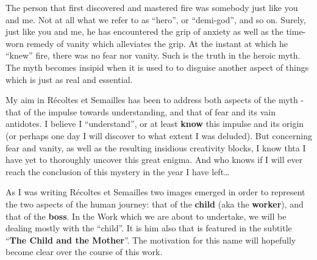 The person that first discovered and mastered fire was somebody just like you and me. 
Not at all what we refer to as ``hero'', or ``demi-god'', and so on.  
Surely, just like you and me, he has encountered the grip of anxiety as well as the 
time-worn remedy of vanity which alleviates the grip.
At the instant at which he ``knew'' fire, there was no fear nor vanity. 
Such is the truth in the heroic myth. 
The myth becomes insipid when it is used to
to disguise another aspect of things which is just as real and essential. 

My aim in R\'ecoltes et Semailles has been to address both aspects of the myth - that of
the impulse towards understanding, and that of fear and its vain antidotes. 
I believe I ``understand'', or at least \textbf{know} this impulse and its origin (or
perhaps one day I will discover to what extent I was deluded). 
But concerning fear and vanity, as well as the resulting insidious creativity blocks, 
I know thta I have yet to thoroughly uncover this great enigma. 
And who knows if I will ever reach the conclusion of this mystery in the year I have
left\ldots

As I was writing 
R\'ecoltes et Semailles 
two images emerged in order to represent the two aspects of the human journey:
that of the \textbf{child} (aka the \textbf{worker}), and that of the
\textbf{boss}.
In the Work which we are about to undertake, we will be dealing mostly with the ``child''.
It is him also that is featured in the subtitle ``\textbf{The Child and the Mother}''. 
The motivation for this name 
will hopefully become clear over the course of this work.

